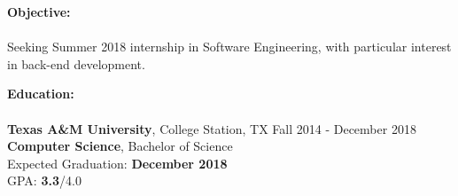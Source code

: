 \documentclass[12pt]{article}
\begin{document}
\begin{flushleft}
  \begin{outline}[compactitem]

    \newlength{\upspacelength}
    \setlength{\upspacelength}{-0.6px}
    \newcommand{\upspace}{\vspace{\upspacelength}}
    \newcommand{\zzz}[1]{\upspace \0 \textbf{#1} \\ \vspace{-0.8\baselineskip} \hrulefill \vspace{-2px} \\ }
    \let\oldOne\1\let\oldTwo\2\let\oldThree\3\let\oldFour\4
    \renewcommand{\1}{\upspace \oldOne  }
    \renewcommand{\2}{\upspace \oldTwo  }
    \renewcommand{\3}{\upspace \oldThree}
    \renewcommand{\4}{\upspace \oldFour }


    \zzz{Objective:}
    \1 Seeking Summer 2018 internship in Software Engineering, with particular interest in back-end development.

    \zzz{Education:}
    \1 \textbf{Texas A\&M University}, College Station, TX \hfill Fall 2014 - December 2018
    \\ \textbf{Computer Science}, Bachelor of Science
    \\ Expected Graduation: \textbf{December 2018}
    \\ GPA:  \textbf{3.3}/4.0


\end{outline}
\end{flushleft}
\end{document}
